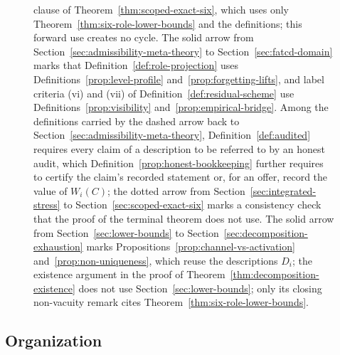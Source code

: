 \begin{figure}[t]
{clause of Theorem~\ref{thm:scoped-exact-six}, which uses only
Theorem~\ref{thm:six-role-lower-bounds} and the definitions; this forward use
creates no cycle. The
solid arrow from Section~\ref{sec:admissibility-meta-theory} to
Section~\ref{sec:fatcd-domain} marks that Definition~\ref{def:role-projection}
uses Definitions~\ref{prop:level-profile} and~\ref{prop:forgetting-lifts}, and
label criteria (vi) and (vii) of Definition~\ref{def:residual-scheme} use
Definitions~\ref{prop:visibility} and~\ref{prop:empirical-bridge}. Among the
definitions carried by the dashed arrow back to
Section~\ref{sec:admissibility-meta-theory}, Definition~\ref{def:audited}
requires every claim of a description to be referred to by an honest audit,
which Definition~\ref{prop:honest-bookkeeping} further requires to certify the claim's recorded statement or, for an offer, record the value of \(W_i(C)\); the dotted arrow from Section~\ref{sec:integrated-stress} to
Section~\ref{sec:scoped-exact-six} marks a consistency check that the proof of
the terminal theorem does not use. The solid arrow from Section~\ref{sec:lower-bounds} to
Section~\ref{sec:decomposition-exhaustion} marks Propositions~\ref{prop:channel-vs-activation}
and~\ref{prop:non-uniqueness}, which reuse the descriptions \(D_i\); the existence argument in the proof of
Theorem~\ref{thm:decomposition-existence} does not use Section~\ref{sec:lower-bounds};
only its closing non-vacuity remark cites Theorem~\ref{thm:six-role-lower-bounds}.}\label{fig:dependencies}
\end{figure}

\subsection{Organization}\label{subsec:organization}

